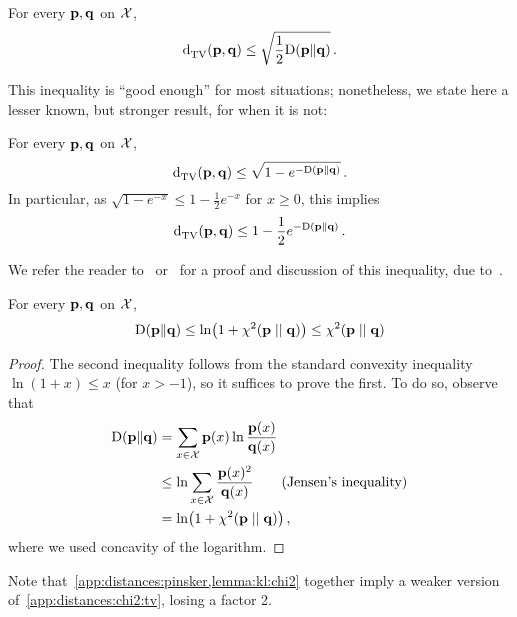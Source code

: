 \begin{lemma}
  \label{app:distances:pinsker}
For every $\mathbf{p},\mathbf{q}$ on $\mathcal{X}$, 
\[
  \totalvardist{\p}{\q} \leq \sqrt{\frac{1}{2}\kldiv{\p}{\q}}\,.
\]
\end{lemma}
This inequality is ``good enough'' for most situations; nonetheless, we state here a lesser known, but stronger result, for when it is not:
\begin{lemma}
  \label{app:distances:bh}
For every $\mathbf{p},\mathbf{q}$ on $\mathcal{X}$, 
\begin{equation}
  \label{eq:bh}
  \totalvardist{\p}{\q} \leq \sqrt{1-e^{-\kldiv{\p}{\q}}}\,.
\end{equation}
In particular, as $\sqrt{1-e^{-x}} \leq 1-\frac{1}{2}e^{-x}$ for $x\geq 0$, this implies
\begin{equation}
  \label{eq:tsybakov}
  \totalvardist{\p}{\q} \leq 1-\frac{1}{2}e^{-\kldiv{\p}{\q}}\,.
\end{equation}
\end{lemma}
We refer the reader to~\citet{Canonne:note:22} or~\citet[Section~2.4.1]{Tsybakov09} for a proof and discussion of this inequality, due to~\citet{BretagnolleH78}.

\begin{lemma}
  \label{lemma:kl:chi2}
For every $\mathbf{p},\mathbf{q}$ on $\mathcal{X}$, 
\[
  \kldiv{\p}{\q} \leq \ln(1+\chisquare{\p}{\q}) \leq \chisquare{\p}{\q}
\]
\end{lemma}
\begin{proof}
  The second inequality follows from the standard convexity inequality $\ln(1+x) \leq x$ (for $x>-1$), so it suffices to prove the first. To do so, observe that
  \begin{align*}
      \kldiv{\p}{\q} 
      &= \sum_{x\in\domain} \p(x)\ln\frac{\p(x)}{\q(x)} \\
      &\leq \ln\sum_{x\in\domain}\frac{\p(x)^2}{\q(x)} \tag{Jensen's inequality}\\
      &= \ln(1+\chisquare{\p}{\q})\,,
  \end{align*}
  where we used concavity of the logarithm.
\end{proof}
\noindent Note that~\cref{app:distances:pinsker,lemma:kl:chi2} together imply a weaker version of~\cref{app:distances:chi2:tv}, losing a factor 2.